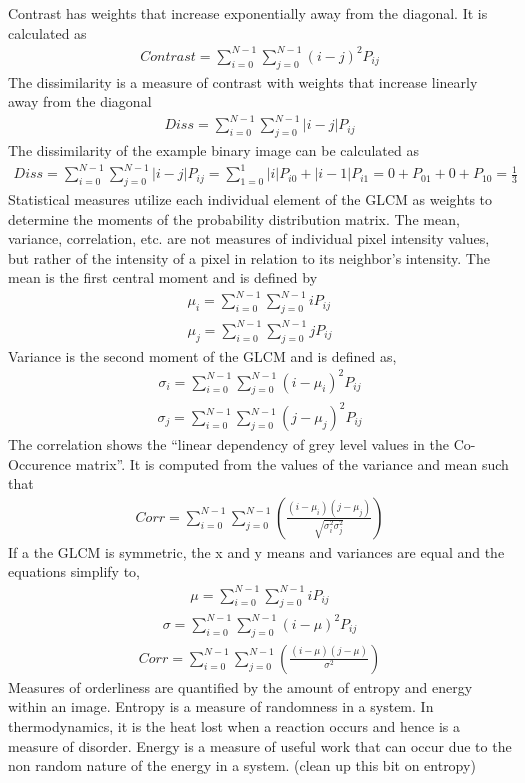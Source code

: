 Contrast has weights that increase exponentially away from the diagonal.  It is calculated as
%
\begin{align}
    Contrast = \sum_{i=0}^{N-1}\sum_{j=0}^{N-1}(i-j)^2P_{ij}
\end{align}
%
The dissimilarity is a measure of contrast with weights that increase linearly away from the diagonal
%
\begin{align}
    Diss = \sum_{i=0}^{N-1}\sum_{j=0}^{N-1}|i-j|P_{ij}
\end{align}
%
The dissimilarity of the example binary image can be calculated as
%
\begin{align}
    Diss = \sum_{i=0}^{N-1}\sum_{j=0}^{N-1}|i-j|P_{ij}
    = \sum_{1=0}^{1}|i|P_{i0}+|i-1|P_{i1}
    = 0 + P_{01} + 0 + P_{10} = \frac{1}{3}
\end{align}
%
Statistical measures utilize each individual element of the GLCM as weights to determine the moments of the probability distribution matrix. The mean, variance, correlation, etc. are not measures of individual pixel intensity values, but rather of the intensity of a pixel in relation to its neighbor’s intensity. The mean is the first central moment and is defined by
%
\begin{align}
    \mu_i = \sum_{i=0}^{N-1}\sum_{j=0}^{N-1}iP_{ij} \\
    \mu_j = \sum_{i=0}^{N-1}\sum_{j=0}^{N-1}jP_{ij}
\end{align}
%
Variance is the second moment of the GLCM and is defined as,
%
\begin{align}
    \sigma_i = \sum_{i=0}^{N-1}\sum_{j=0}^{N-1}(i-\mu_i)^2P_{ij}
\end{align}
\begin{align}
    \sigma_j = \sum_{i=0}^{N-1}\sum_{j=0}^{N-1}(j-\mu_j)^2P_{ij}
\end{align}
%
The correlation shows the “linear dependency of grey level values in the Co-Occurence matrix”\cite{haralickcancer}.  It is computed from the values of the variance and mean such that
%
\begin{align}
    Corr = \sum_{i=0}^{N-1}\sum_{j=0}^{N-1}(\frac{(i-\mu_i)(j-\mu_j)}{\sqrt{\sigma_i^2 \sigma_j^2}})
\end{align}
%
If a the GLCM is symmetric, the x and y means and variances are equal and the equations simplify to,
%
\begin{align}
    \mu = \sum_{i=0}^{N-1}\sum_{j=0}^{N-1}iP_{ij}
\end{align}
\begin{align}
    \sigma = \sum_{i=0}^{N-1}\sum_{j=0}^{N-1}(i-\mu)^2P_{ij}
\end{align}
\begin{align}
    Corr = \sum_{i=0}^{N-1}\sum_{j=0}^{N-1}(\frac{(i-\mu)(j-\mu)}{\sigma^2})
\end{align}
%
Measures of orderliness are quantified by the amount of entropy and energy within an image.  Entropy is a measure of randomness in a system.  In thermodynamics, it is the heat lost when a reaction occurs and hence is a measure of disorder.  Energy is a measure of useful work that can occur due to the non random nature of the energy in a system. (clean up this bit on entropy)

